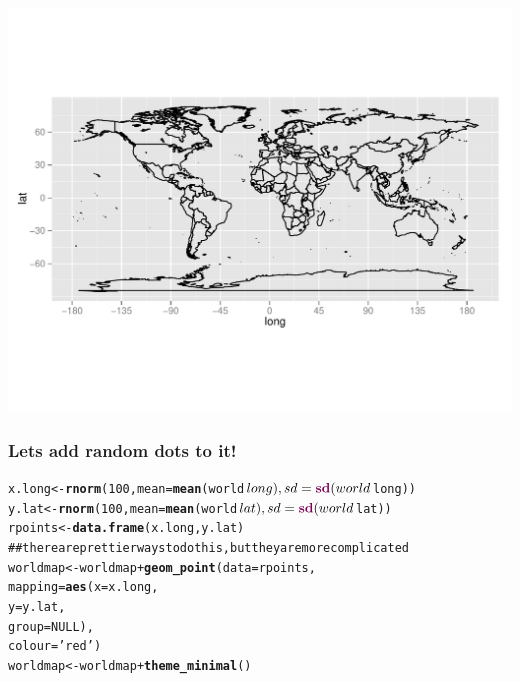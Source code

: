 \documentclass{beamer}\usepackage{graphicx, color}
\makeatletter
\def\maxwidth{ %
  \ifdim\Gin@nat@width>\linewidth
    \linewidth
  \else
    \Gin@nat@width
  \fi
}
\newcommand{\hlfunctioncall}[1]{\textcolor[rgb]{0.501960784313725,0,0.329411764705882}{\textbf{#1}}}%
\newcommand{\hlstring}[1]{\textcolor[rgb]{0.6,0.6,1}{#1}}%
\newcommand{\hlcomment}[1]{\textcolor[rgb]{0.180392156862745,0.6,0.341176470588235}{#1}}%
\newenvironment{kframe}{%
 \def\at@end@of@kframe{}%
 \ifinner\ifhmode%
  \def\at@end@of@kframe{\end{minipage}}%
  \begin{minipage}{\columnwidth}%
 \fi\fi%
 \def\FrameCommand##1{\hskip\@totalleftmargin \hskip-\fboxsep
 \colorbox{shadecolor}{##1}\hskip-\fboxsep
     \hskip-\linewidth \hskip-\@totalleftmargin \hskip\columnwidth}%
 \MakeFramed {\advance\hsize-\width
   \@totalleftmargin\z@ \linewidth\hsize
   \@setminipage}}%
 {\par\unskip\endMakeFramed%
 \at@end@of@kframe}
\newenvironment{knitrout}{}{} %
\makeatother
\begin{document}
\begin{frame}[fragile]
\begin{knitrout}\scriptsize
{}\color{fgcolor}
\includegraphics[width=\maxwidth]{figure/unnamed-chunk-10} 

\end{knitrout}

\end{frame}

\begin{frame}[fragile]
  \frametitle{Lets add random dots to it!}
\begin{knitrout}\scriptsize
{}\color{fgcolor}\begin{kframe}
\begin{alltt}
x.long <- \hlfunctioncall{rnorm}(100, mean = \hlfunctioncall{mean}(world$long), sd = \hlfunctioncall{sd}(world$long))
y.lat <- \hlfunctioncall{rnorm}(100, mean = \hlfunctioncall{mean}(world$lat), sd = \hlfunctioncall{sd}(world$lat))
rpoints <- \hlfunctioncall{data.frame}(x.long, y.lat)
\hlcomment{## there are prettier ways to do this, but they are more complicated}
worldmap <- worldmap + \hlfunctioncall{geom_point}(data = rpoints,
                                  mapping = \hlfunctioncall{aes}(x = x.long, 
                                                y = y.lat, 
                                                group = NULL),
                                  colour = \hlstring{'red'})
worldmap <- worldmap + \hlfunctioncall{theme_minimal}()
\end{alltt}
\end{kframe}
\end{knitrout}

\end{frame}
\end{document}
